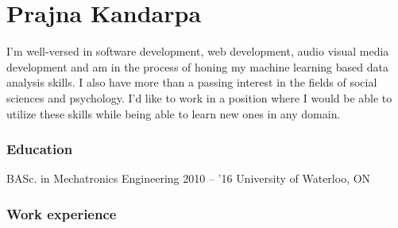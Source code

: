 \documentclass{tccv}
\begin{document}
\part{Prajna Kandarpa}
I'm well-versed in software development, web development, audio visual media development and am in the process of honing my machine learning based data analysis skills. I also have more than a passing interest in the fields of social sciences and psychology. I'd like to work in a position where I would be able to utilize these skills while being able to learn new ones in any domain.
\section{Education}

\begin{yearlist}

\item[BASc. in Mechatronics Engineering]{2010 -- '16}
  {University of Waterloo, ON}
  {}
\end{yearlist}
\section{Work experience}
\end{document}
